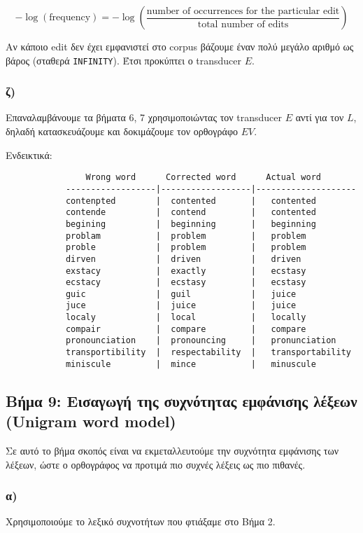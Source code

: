 \documentclass[a4paper, 12pt]{article}
\begin{document}
        	\[
        		-\log\left(\text{frequency}\right) = -\log\left(\frac{\text{number of occurrences for the particular edit}}{\text{total number of edits}}\right)
        	\]
        	
        	Αν κάποιο edit δεν έχει εμφανιστεί στο corpus βάζουμε έναν πολύ μεγάλο αριθμό ως βάρος (σταθερά \verb|INFINITY|). Έτσι προκύπτει ο transducer $E$.
        
        \subsubsection*{ζ)}
        	Επαναλαμβάνουμε τα βήματα 6, 7 χρησιμοποιώντας τον transducer $E$ αντί για τον $L$, δηλαδή κατασκευάζουμε και δοκιμάζουμε τον ορθογράφο $EV$.
        	
        	Ενδεικτικά:
        	
        \begin{verbatim}
			    Wrong word      Corrected word      Actual word
			------------------|------------------|--------------------
			contenpted        |  contented       |   contented
			contende          |  contend         |   contented
			begining          |  beginning       |   beginning
			problam           |  problem         |   problem
			proble            |  problem         |   problem
			dirven            |  driven          |   driven
			exstacy           |  exactly         |   ecstasy
			ecstacy           |  ecstasy         |   ecstasy
			guic              |  guil            |   juice
			juce              |  juice           |   juice
			localy            |  local           |   locally
			compair           |  compare         |   compare
			pronounciation    |  pronouncing     |   pronunciation
			transportibility  |  respectability  |   transportability
			miniscule         |  mince           |   minuscule
         \end{verbatim}
    
    \subsection*{Βήμα 9: Εισαγωγή της συχνότητας εμφάνισης λέξεων (Unigram word model)}
    	Σε αυτό το βήμα σκοπός είναι να εκμεταλλευτούμε την συχνότητα εμφάνισης των λέξεων, ώστε ο ορθογράφος να προτιμά πιο συχνές λέξεις ως πιο πιθανές. 
    
        \subsubsection*{α)}
        	Χρησιμοποιούμε το λεξικό συχνοτήτων που φτιάξαμε στο Βήμα 2.
        	   
\end{document}
